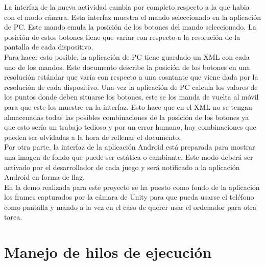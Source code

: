 La interfaz de la nueva actividad cambia por completo respecto a la que habia con el modo c\'amara. Esta interfaz muestra el mando seleccionado en la aplicaci\'on de PC. Este mando emula la posici\'on de los botones del mando seleccionado. La posici\'on de estos botones tiene que variar con respecto a la resoluci\'on de la pantalla de cada dispositivo.
\\
 Para hacer esto posible, la aplicaci\'on de PC tiene guardado un XML con cada uno de los mandos. Este documento describe la posici\'on de los botones en una resoluci\'on est\'andar que var\'ia con respecto a una cosntante que viene dada por la resoluci\'on de cada dispositivo. Una vez la aplicaci\'on de PC calcula los valores de los puntos donde deben situarse los botones, este se los manda de vuelta al m\'ovil para que este los muestre en la interfaz. Esto hace que en el XML no se tengan almacenadas todas las posibles combinaciones de la posici\'on de los botones ya que esto ser\'ia un trabajo tedioso y por un error humano, hay combinaciones que pueden ser olvidadas a la hora de rellenar el documento.
\\
Por otra parte, la interfaz de la aplicaci\'on Android est\'a preparada para mostrar una imagen de fondo que puede ser est\'atica o cambiante. Este modo deber\'a ser activado por el desarrollador de cada juego y ser\'a notificado a la aplicaci\'on Android en forma de flag. 
\\
En la demo realizada para este proyecto se ha puesto como fondo de la aplicaci\'on los frames capturados por la c\'amara de Unity para que pueda usarse el tel\'efono como pantalla y mando a la vez en el caso de querer usar el ordenador para otra tarea. 
\section{Manejo de hilos de ejecuci\'on}
\label{cap5:sec:hilos}


